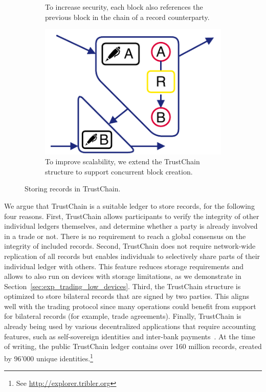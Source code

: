 \begin{figure}[t]
\begin{subfigure}[t]{.4\textwidth}
		\caption{To increase security, each block also references the previous block in the chain of a record counterparty.}
		\label{fig:trustchain_tutorial_3}
	\end{subfigure}
	\begin{subfigure}[t]{.4\textwidth}
		\centering
		\captionsetup{width=.9\linewidth}
		\includegraphics[width=.71\linewidth]{xchange/assets/trustchain_tutorial_4}
		\caption{To improve scalability, we extend the TrustChain structure to support concurrent block creation.}
		\label{fig:trustchain_tutorial_4}
	\end{subfigure}\hspace{0.05\textwidth}%
	\caption{Storing records in TrustChain.}
	\label{fig:trustchain_tutorial}
\end{figure}

We argue that TrustChain is a suitable ledger to store \ModelName{} records, for the following four reasons.
First, TrustChain allows participants to verify the integrity of other individual ledgers themselves, and determine whether a party is already involved in a trade or not.
There is no requirement to reach a global consensus on the integrity of included records.
Second, TrustChain does not require network-wide replication of all records but enables individuals to selectively share parts of their individual ledger with others.
This feature reduces storage requirements and allows \ModelName{} to also run on devices with storage limitations, as we demonstrate in Section~\ref{sec:exp_trading_low_devices}.
Third, the TrustChain structure is optimized to store bilateral records that are signed by two parties.
This aligns well with the \ModelName{} trading protocol since many operations could benefit from support for bilateral records (for example, trade agreements).
Finally, TrustChain is already being used by various decentralized applications that require accounting features, such as self-sovereign identities and inter-bank payments~\cite{stokkink2018deployment,de2018real}.
At the time of writing, the public TrustChain ledger contains over 160 million records, created by 96'000 unique identities.\footnote{See \url{http://explorer.tribler.org}}

